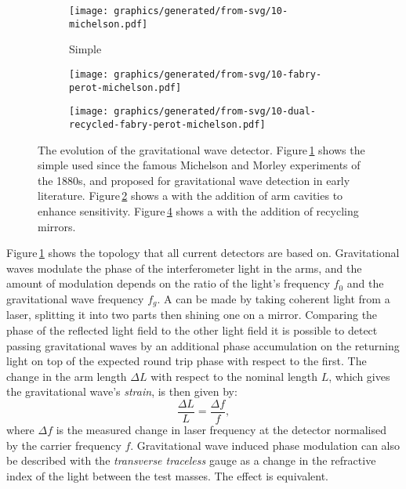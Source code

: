\begin{figure}
  \begin{center}
    \begin{subfigure}{.3\textwidth}
      \texttt{[image: graphics/generated/from-svg/10-michelson.pdf]}
      \caption{Simple \MI{}}
      \label{fig:mi}
    \end{subfigure}
    \hfill
    \begin{subfigure}{.3\textwidth}
      \texttt{[image: graphics/generated/from-svg/10-fabry-perot-michelson.pdf]}
      \caption{\FPMI{}}
      \label{fig:fpmi}
    \end{subfigure}
    \hfill
    \begin{subfigure}{.3\textwidth}
      \texttt{[image: graphics/generated/from-svg/10-dual-recycled-fabry-perot-michelson.pdf]}
      \caption{\DRFPMI{}}
      \label{fig:drfpmi}
    \end{subfigure}
    \caption[The evolution of the gravitational wave detector]{The evolution of the gravitational wave detector. Figure\,\ref{fig:mi} shows the simple \MI{} used since the famous Michelson and Morley experiments of the 1880s, and proposed for gravitational wave detection in early literature. Figure\,\ref{fig:fpmi} shows a \MI{} with the addition of \FP{} arm cavities to enhance sensitivity. Figure\,\ref{fig:drfpmi} shows a \FPMI{} with the addition of recycling mirrors.}
  \end{center}
\end{figure}

Figure\,\ref{fig:mi} shows the \MI{} topology that all current detectors are based on. Gravitational waves modulate the phase of the interferometer light in the arms, and the amount of modulation depends on the ratio of the light's frequency $f_0$ and the gravitational wave frequency $f_g$. A \MI{} can be made by taking coherent light from a laser, splitting it into two parts then shining one on a mirror. Comparing the phase of the reflected light field to the other light field it is possible to detect passing gravitational waves by an additional phase accumulation on the returning light on top of the expected round trip phase with respect to the first. The change in the arm length $\Delta L$ with respect to the nominal length $L$, which gives the gravitational wave's \emph{strain}, is then given by:
\begin{equation}
  \label{eq:freq-to-length}
  \frac{\Delta L}{L} = \frac{\Delta f}{f},
\end{equation}
where $\Delta f$ is the measured change in laser frequency at the detector normalised by the carrier frequency $f$. Gravitational wave induced phase modulation can also be described with the \emph{transverse traceless} gauge as a change in the refractive index of the light between the test masses. The effect is equivalent.

